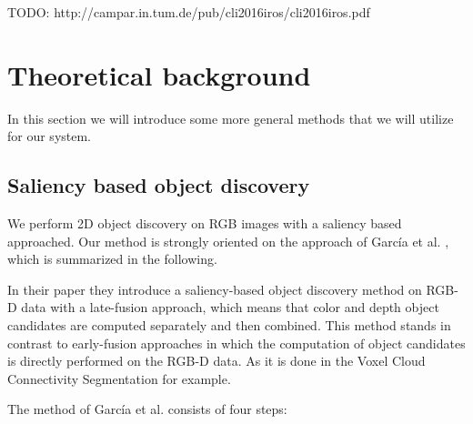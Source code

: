 \documentclass[a4paper,11pt,english]{article}
\begin{document}
TODO: http://campar.in.tum.de/pub/cli2016iros/cli2016iros.pdf

\section{Theoretical background}
\label{background}
In this section we will introduce some more general methods that we will utilize for our system.

\subsection{Saliency based object discovery}
\label{background:saliencyobjectdiscovery}
We perform 2D object discovery on RGB images with a saliency based approached.
Our method is strongly oriented on the approach of García et al. \cite{garcia2015saliency}, which is summarized in the following.

In their paper they introduce a saliency-based object discovery method on RGB-D data with a late-fusion approach, which means that color and depth object candidates are computed separately and then combined.
This method stands in contrast to early-fusion approaches in which the computation of object candidates is directly performed on the RGB-D data. As it is done in the Voxel Cloud Connectivity Segmentation \cite{papon2013voxel} for example. 

The method of García et al. consists of four steps:
\end{document}
